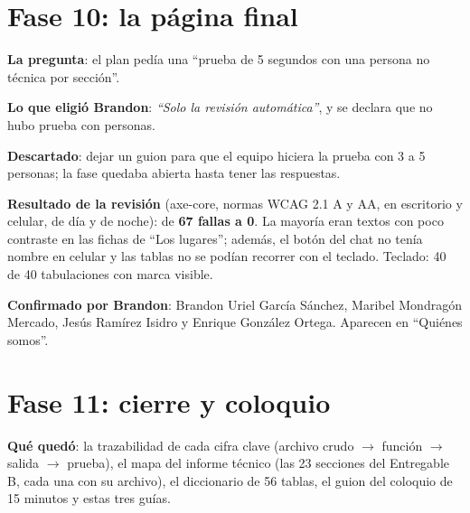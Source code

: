 \section{Fase 10: la página final}
\begin{opciones}
\textbf{La pregunta}: el plan pedía una ``prueba de 5 segundos con una persona no técnica por sección''.

\textbf{Lo que eligió Brandon}: \emph{``Solo la revisión automática''}, y se declara que no hubo prueba con personas.

\textbf{Descartado}: dejar un guion para que el equipo hiciera la prueba con 3 a 5 personas; la fase quedaba abierta hasta
tener las respuestas.

\textbf{Resultado de la revisión} (axe-core, normas WCAG 2.1 A y AA, en escritorio y celular, de día y de noche): de
\textbf{67 fallas a 0}. La mayoría eran textos con poco contraste en las fichas de ``Los lugares''; además, el botón del chat
no tenía nombre en celular y las tablas no se podían recorrer con el teclado. Teclado: 40 de 40 tabulaciones con marca
visible.
\end{opciones}

\begin{opciones}
\textbf{Confirmado por Brandon}: Brandon Uriel García Sánchez, Maribel Mondragón Mercado, Jesús Ramírez Isidro y Enrique
González Ortega. Aparecen en ``Quiénes somos''.
\end{opciones}

\section{Fase 11: cierre y coloquio}
\textbf{Qué quedó}: la trazabilidad de cada cifra clave (archivo crudo $\to$ función $\to$ salida $\to$ prueba), el mapa del
informe técnico (las 23 secciones del Entregable B, cada una con su archivo), el diccionario de 56 tablas, el guion del
coloquio de 15 minutos y estas tres guías.

